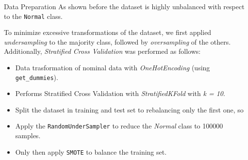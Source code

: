 \documentclass[12pt,aspectratio=169,notheorems]{beamer}
\begin{document}
\begin{frame}{Data Preparation}
    \small As shown before the dataset is highly unbalanced with respect to the \texttt{Normal} class. 
    \vspace{-0.1cm}
        \begin{table}[t]
        \end{table}
        \vspace{-0.1cm}
        \small To minimize excessive transformations of the dataset, we first applied \emph{undersampling} to the majority class, followed by \emph{oversampling} of the others. Additionally, \emph{Stratified Cross Validation} was performed as follows:
    \begin{itemize}
        \item Data trasformation of nominal data with \emph{OneHotEncoding} (using \texttt{get\_dummies}).
        \item Performs Stratified Cross Validation with \emph{StratifiedKFold} with \emph{k = 10}.
        \item Split the dataset in training and test set to rebalancing only the first one, so
        \item Apply the \texttt{RandomUnderSampler} to reduce the \emph{Normal} class to 100000 samples.
        \item Only then apply \texttt{SMOTE} to balance the training set.
    \end{itemize}
\end{frame}
\end{document}

